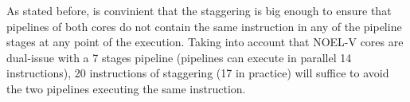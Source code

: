 As stated before, is convinient that the staggering is big enough to ensure that pipelines of both cores do not contain the same instruction in any of the pipeline stages at any point of the execution. Taking into account that NOEL-V cores are dual-issue with a 7 stages pipeline (pipelines can execute in parallel 14 instructions), 20 instructions of staggering (17 in practice) will suffice to avoid the two pipelines executing the same instruction. 






